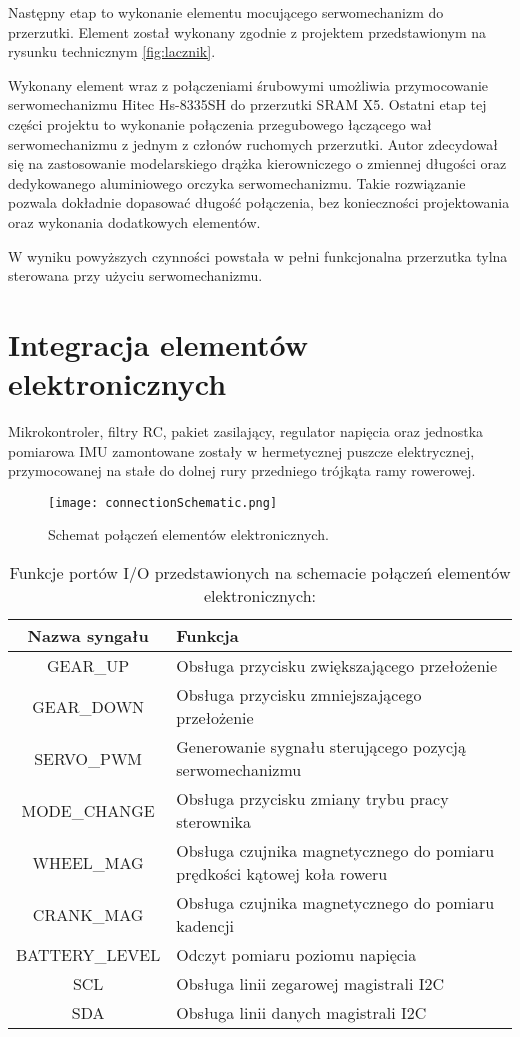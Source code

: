 Następny etap to wykonanie elementu mocującego serwomechanizm do przerzutki. Element został wykonany zgodnie z projektem przedstawionym na rysunku technicznym \ref{fig:lacznik}.


Wykonany element wraz z połączeniami śrubowymi umożliwia przymocowanie serwomechanizmu Hitec Hs-8335SH do przerzutki SRAM X5. Ostatni etap tej części projektu to wykonanie połączenia przegubowego łączącego wał serwomechanizmu z jednym z członów ruchomych przerzutki. Autor zdecydował się na zastosowanie modelarskiego drążka kierowniczego o zmiennej długości oraz dedykowanego aluminiowego orczyka serwomechanizmu. Takie rozwiązanie pozwala dokładnie dopasować długość  połączenia, bez konieczności projektowania oraz wykonania dodatkowych elementów.

W wyniku powyższych czynności powstała w pełni funkcjonalna przerzutka tylna sterowana przy użyciu serwomechanizmu. 

\section{Integracja elementów elektronicznych}
Mikrokontroler, filtry RC, pakiet zasilający, regulator napięcia oraz jednostka pomiarowa IMU zamontowane zostały w hermetycznej puszcze elektrycznej, przymocowanej na stałe do dolnej rury przedniego trójkąta ramy rowerowej.

\begin{figure}[h]
    \centering
    \texttt{[image: connectionSchematic.png]}
    \caption{Schemat połączeń elementów elektronicznych.}
    \label{fig:schematPolaczen}
\end{figure}

\begin{table}[h]
    \caption{Funkcje portów I/O przedstawionych na schemacie połączeń elementów elektronicznych:}
    \begin{center}
		\label{tab:portyGPIO}
		\begin{tabular}{|c|>{\centering}m{8cm}|}
 			\hline
 			\textbf{Nazwa syngału} & \textbf{Funkcja} \tabularnewline
 			\hline
 			GEAR\_UP & Obsługa przycisku zwiększającego przełożenie \tabularnewline
 			\hline
 			GEAR\_DOWN &  Obsługa przycisku zmniejszającego przełożenie \tabularnewline
 			\hline
 			SERVO\_PWM & Generowanie sygnału sterującego pozycją serwomechanizmu \tabularnewline
 			\hline
 			MODE\_CHANGE &  Obsługa przycisku zmiany trybu pracy sterownika\tabularnewline
 			\hline
 			WHEEL\_MAG & Obsługa czujnika magnetycznego do pomiaru prędkości kątowej koła roweru \tabularnewline
 			\hline
 			CRANK\_MAG & Obsługa czujnika magnetycznego do pomiaru kadencji \tabularnewline
 			\hline
 			BATTERY\_LEVEL & Odczyt pomiaru poziomu napięcia \tabularnewline
 			\hline
 			SCL &  Obsługa linii zegarowej magistrali I2C \tabularnewline
 			\hline
 			SDA & Obsługa linii danych magistrali I2C \tabularnewline
 			\hline
		\end{tabular}
	\end{center}
\end{table}

